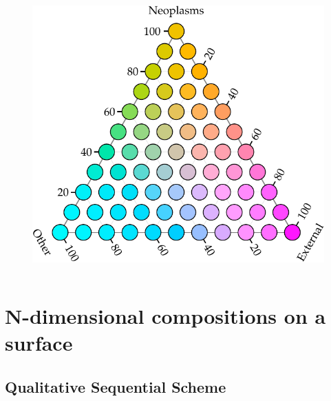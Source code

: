 \documentclass{beamer}
\begin{document}
\begin{frame}
\begin{columns}[c]
\begin{figure}[htb!]
\includegraphics[width = \textwidth]{../fig/plot-tern_balance_lgnd.pdf}
\end{figure}

\end{columns}

\end{frame}

\section{N-dimensional compositions on a surface} %

\subsection{Qualitative Sequential Scheme}
\end{document}
